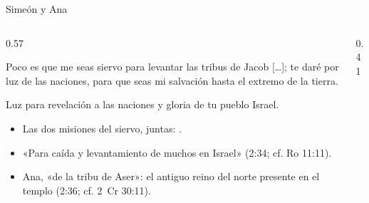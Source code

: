 \begin{frame}{Simeón y Ana}
\begin{columns}[c,onlytextwidth]
\begin{column}{0.57\textwidth}
\begin{cita}Poco es que me seas siervo para levantar las tribus de Jacob [\ldots]; te daré por luz de las naciones, para que seas mi salvación hasta el extremo de la tierra.\end{cita}
\begin{cita}Luz para revelación a las naciones y gloria de tu pueblo Israel.\end{cita}
\scriptsize
\begin{itemize}
\item Las dos misiones del siervo, juntas: .
\item «Para caída y levantamiento de muchos en Israel» (2:34; cf. Ro 11:11).
\item Ana, «de la tribu de Aser»: el antiguo reino del norte presente en el templo (2:36; cf. 2~Cr 30:11).
\end{itemize}
\end{column}
\begin{column}{0.41\textwidth}\end{column}
\end{columns}
\end{frame}

